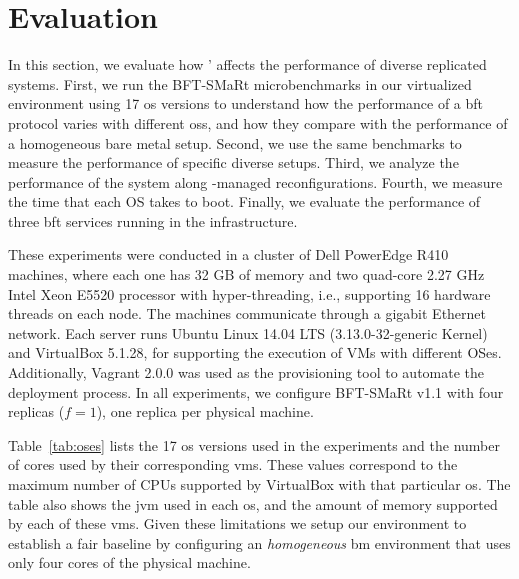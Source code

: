 \section{Evaluation}
\label{sec:overhead}

In this section, we evaluate how \system' affects the performance of diverse replicated systems.
First, we run the BFT-SMaRt microbenchmarks in our virtualized environment using 17 \gls{os} versions to understand how the performance of a \gls{bft} protocol varies with different \glspl{os}, and how they compare with the performance of a homogeneous bare metal setup.
Second, we use the same benchmarks to measure the performance of specific diverse setups.
Third, we analyze the performance of the system along \system-managed reconfigurations.
Fourth, we measure the time that each OS takes to boot.
Finally, we evaluate the performance of three \gls{bft} services running in the \system infrastructure.


These experiments were conducted in a cluster of Dell PowerEdge R410 machines, where each one has 32 GB of memory and two quad-core 2.27 GHz Intel Xeon E5520 processor with hyper-threading, i.e., supporting 16 hardware threads on each node.
The machines communicate through a gigabit Ethernet network.
Each server runs Ubuntu Linux 14.04 LTS (3.13.0-32-generic Kernel) and VirtualBox 5.1.28, for supporting the execution of VMs with different OSes. 
Additionally, Vagrant 2.0.0 was used as the provisioning tool to automate the deployment process.
In all experiments, we configure BFT-SMaRt v1.1 with four replicas ($f=1$), one replica per physical machine.

Table~\ref{tab:oses} lists the 17 \gls{os} versions used in the experiments and the number of cores used by their corresponding \glspl{vm}.
These values correspond to the maximum number of CPUs supported by VirtualBox with that particular \gls{os}.
The table also shows the \gls{jvm} used in each \gls{os}, and the amount of memory supported by each of these \glspl{vm}.
Given these limitations we setup our environment to establish a fair baseline by configuring an \emph{homogeneous} \gls{bm} environment that uses only four cores of the physical machine. 



